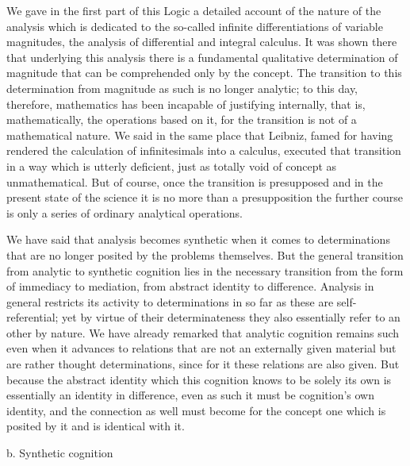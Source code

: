 We gave in the first part of this Logic
a detailed account of the nature of the analysis
which is dedicated to the so-called
infinite differentiations of variable magnitudes,
the analysis of differential and integral calculus.
It was shown there that underlying this analysis
there is a fundamental qualitative determination of magnitude
that can be comprehended only by the concept.
The transition to this determination from
magnitude as such is no longer analytic;
to this day, therefore, mathematics has been
incapable of justifying internally,
that is, mathematically, the operations based on it,
for the transition is not of a mathematical nature.
We said in the same place that Leibniz,
famed for having rendered the calculation of
infinitesimals into a calculus,
executed that transition in a way
which is utterly deficient,
just as totally void of concept as unmathematical.
But of course, once the transition is presupposed
and in the present state of the science
it is no more than a presupposition
the further course is only a series of
ordinary analytical operations.

We have said that analysis becomes synthetic
when it comes to determinations that are
no longer posited by the problems themselves.
But the general transition from
analytic to synthetic cognition
lies in the necessary transition from
the form of immediacy to mediation,
from abstract identity to difference.
Analysis in general restricts its activity
to determinations in so far as
these are self-referential;
yet by virtue of their determinateness
they also essentially refer to an other by nature.
We have already remarked that
analytic cognition remains such even
when it advances to relations that
are not an externally given material
but are rather thought determinations,
since for it these relations are also given.
But because the abstract identity
which this cognition knows to be solely its own is
essentially an identity in difference,
even as such it must be cognition's own identity,
and the connection as well must become for the concept
one which is posited by it
and is identical with it.

b. Synthetic cognition


